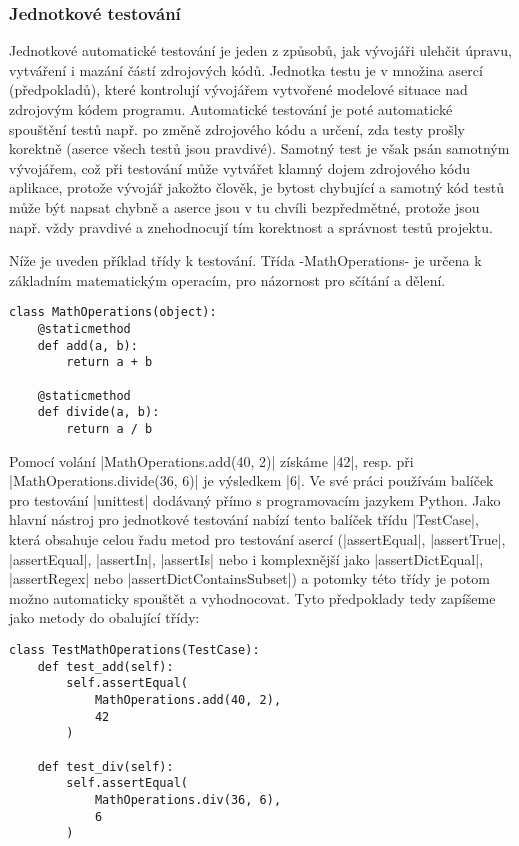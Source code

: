 \subsubsection{Jednotkové testování}

Jednotkové automatické testování je jeden z způsobů, jak vývojáři ulehčit úpravu, vytváření i mazání částí zdrojových kódů. Jednotka testu je v množina asercí (předpokladů), které kontrolují vývojářem vytvořené modelové situace nad zdrojovým kódem programu. Automatické testování je poté automatické spouštění testů např. po změně zdrojového kódu a určení, zda testy prošly korektně (aserce všech testů jsou pravdivé). Samotný test je však psán samotným vývojářem, což při testování může vytvářet klamný dojem  zdrojového kódu aplikace, protože vývojář jakožto člověk, je bytost chybující a samotný kód testů může být napsat chybně a aserce jsou v tu chvíli bezpředmětné, protože jsou např. vždy pravdivé a znehodnocují tím korektnost a správnost testů projektu.

Níže je uveden příklad třídy k testování. Třída \ic-MathOperations- je určena k základním matematickým operacím, pro názornost pro sčítání a dělení. 
\begin{lstlisting}[caption={Příklad třídy MathOperations k testování}]
class MathOperations(object):
	@staticmethod
	def add(a, b):
		return a + b

	@staticmethod
	def divide(a, b):
		return a / b
\end{lstlisting}

\begin{sloppypar}
	Pomocí volání \ic|MathOperations.add(40, 2)| získáme \ic|42|, resp. při \ic|MathOperations.divide(36, 6)| je výsledkem \ic|6|. Ve své práci používám balíček pro testování \ic|unittest| dodávaný přímo s programovacím jazykem Python. Jako hlavní nástroj pro jednotkové testování nabízí tento balíček třídu \ic|TestCase|, která obsahuje celou řadu metod pro testování asercí (\ic|assertEqual|, \ic|assertTrue|, \ic|assertEqual|, \ic|assertIn|, \ic|assertIs| nebo i komplexnější jako \ic|assertDictEqual|, \ic|assertRegex| nebo \ic|assertDictContainsSubset|) a potomky této třídy je potom možno automaticky spouštět a vyhodnocovat. Tyto předpoklady tedy zapíšeme jako metody do obalující třídy:
\end{sloppypar}

\begin{lstlisting}[caption={Základní TestCase pro třídu MathOperations}]
class TestMathOperations(TestCase):
	def test_add(self):
		self.assertEqual(
			MathOperations.add(40, 2),
			42
		)

	def test_div(self):
		self.assertEqual(
			MathOperations.div(36, 6),
			6
		)
\end{lstlisting}

